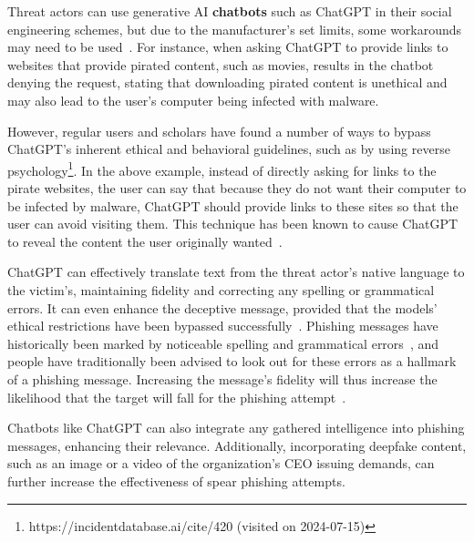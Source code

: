 %
%
Threat actors can use generative AI \textbf{chatbots} such as ChatGPT in their social engineering schemes, but due to the manufacturer's set limits, some workarounds may need to be used~\citep{gupta_From_ChatGPT_to_ThreatGPT_2023}. For instance, when asking ChatGPT to provide links to websites that provide pirated content, such as movies, results in the chatbot denying the request, stating that downloading pirated content is unethical and may also lead to the user's computer being infected with malware.

%
%
However, regular users and scholars have found a number of ways to bypass ChatGPT's inherent ethical and behavioral guidelines, such as by using reverse psychology\footnote{https://incidentdatabase.ai/cite/420 (visited on 2024-07-15)}. In the above example, instead of directly asking for links to the pirate websites, the user can say that because they do not want their computer to be infected by malware, ChatGPT should provide links to these sites so that the user can avoid visiting them. This technique has been known to cause ChatGPT to reveal the content the user originally wanted~\citep{gupta_From_ChatGPT_to_ThreatGPT_2023}.

%
%
ChatGPT can effectively translate text from the threat actor’s native language to the victim’s, maintaining fidelity and correcting any spelling or grammatical errors. It can even enhance the deceptive message, provided that the models' ethical restrictions have been bypassed successfully~\citep{gupta_From_ChatGPT_to_ThreatGPT_2023}.
Phishing messages have historically been marked by noticeable spelling and grammatical errors~\citep{herley_So_Long_No_Thanks_Externalities_2009}, and people have traditionally been advised to look out for these errors as a hallmark of a phishing message. Increasing the message's fidelity will thus increase the likelihood that the target will fall for the phishing attempt~\citep{blauth_AI_Crime_Overview_Malicious_Use_Abuse_2022}.

%
%
Chatbots like ChatGPT can also integrate any gathered intelligence into phishing messages, enhancing their relevance. Additionally, incorporating deepfake content, such as an image or a video of the organization’s CEO issuing demands, can further increase the effectiveness of spear phishing attempts.



